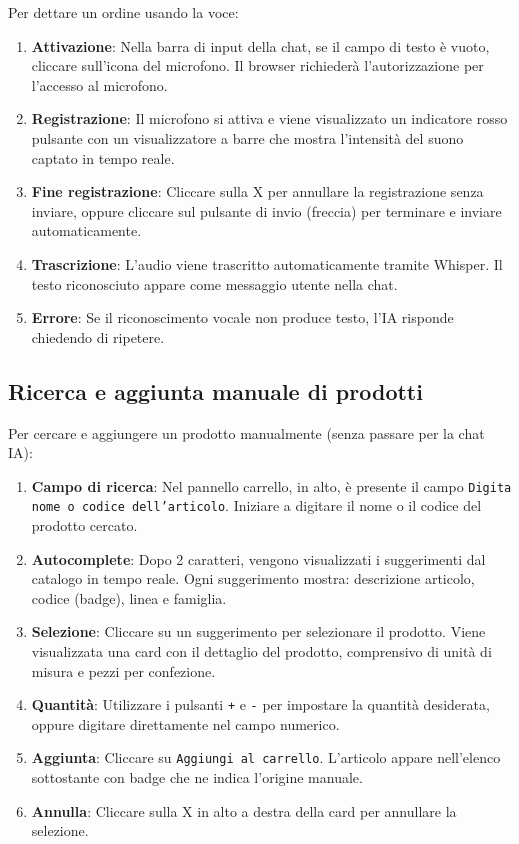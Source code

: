 \documentclass[a4paper, 11pt, oneside]{scrartcl}
\begin{document}
Per dettare un ordine usando la voce:

\begin{enumerate}
    \item \textbf{Attivazione}: Nella barra di input della chat, se il campo di testo \`e vuoto, cliccare sull'icona del microfono. Il browser richieder\`a l'autorizzazione per l'accesso al microfono.
    \item \textbf{Registrazione}: Il microfono si attiva e viene visualizzato un indicatore rosso pulsante con un visualizzatore a barre che mostra l'intensit\`a del suono captato in tempo reale.
    \item \textbf{Fine registrazione}: Cliccare sulla X per annullare la registrazione senza inviare, oppure cliccare sul pulsante di invio (freccia) per terminare e inviare automaticamente.
    \item \textbf{Trascrizione}: L'audio viene trascritto automaticamente tramite Whisper. Il testo riconosciuto appare come messaggio utente nella chat.
    \item \textbf{Errore}: Se il riconoscimento vocale non produce testo, l'IA risponde chiedendo di ripetere.
\end{enumerate}

\subsection{Ricerca e aggiunta manuale di prodotti}

Per cercare e aggiungere un prodotto manualmente (senza passare per la chat IA):

\begin{enumerate}
    \item \textbf{Campo di ricerca}: Nel pannello carrello, in alto, \`e presente il campo \texttt{Digita nome o codice dell'articolo}. Iniziare a digitare il nome o il codice del prodotto cercato.
    \item \textbf{Autocomplete}: Dopo 2 caratteri, vengono visualizzati i suggerimenti dal catalogo in tempo reale. Ogni suggerimento mostra: descrizione articolo, codice (badge), linea e famiglia.
    \item \textbf{Selezione}: Cliccare su un suggerimento per selezionare il prodotto. Viene visualizzata una card con il dettaglio del prodotto, comprensivo di unit\`a di misura e pezzi per confezione.
    \item \textbf{Quantit\`a}: Utilizzare i pulsanti \texttt{+} e \texttt{-} per impostare la quantit\`a desiderata, oppure digitare direttamente nel campo numerico.
    \item \textbf{Aggiunta}: Cliccare su \texttt{Aggiungi al carrello}. L'articolo appare nell'elenco sottostante con badge che ne indica l'origine manuale.
    \item \textbf{Annulla}: Cliccare sulla X in alto a destra della card per annullare la selezione.
\end{enumerate}
\end{document}
